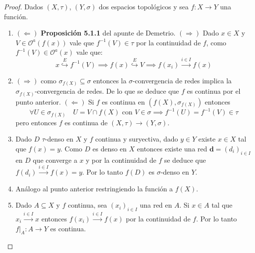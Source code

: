 \documentclass{article}
\theoremstyle{plain}
\theoremstyle{definition}
\newcommand{\evto}[1]{\stackrel{E}{\hookrightarrow} #1}   %
\begin{document}
\begin{proof}
    Dados \( (X, \tau) \), \( (Y, \sigma) \) dos espacios topológicos y sea \( f : X \to Y \) una función.
    \begin{enumerate}
        \item \( (\Leftarrow) \) \textbf{Proposición 5.1.1} del apunte de Demetrio. \( (\Rightarrow) \) Dado \( x \in X \) y \( V \in \mathcal{O}^a(f(x)) \) vale que \( f^{-1}(V) \in \tau \) por la continuidad de \( f \),
              como \( f^{-1}(V) \in \mathcal{O}^a(x) \) vale que: \[
                  x \evto{f^{-1}(V)} \implies f(x) \evto{V} \implies f(x_i) \xrightarrow{i \in I} f(x)
              \]
        \item \( (\Rightarrow) \) como \( \sigma_{f(X)} \subseteq \sigma \) entonces la \( \sigma \)-convergencia de redes implica la \( \sigma_{f(X)} \)-convergencia de redes.
              De lo que se deduce que \( f \) es continua por el punto anterior. \( (\Leftarrow) \) Si \( f \) es continua en \( (f(X), \sigma_{f(X)}) \) entonces \[
                  \forall U \in \sigma_{f(X)} \quad U = V \cap f(X) \text{ con } V \in \sigma \implies f^{-1}(U) = f^{-1}(V) \in \tau
              \]
              pero entonces \( f \) es continua de \( (X, \tau) \to (Y, \sigma) \).
        \item Dado \( D \) \( \tau \)-denso en \( X \) y \( f \) continua y suryectiva, dado \( y \in Y \) existe \( x \in X \) tal que \( f(x) = y \).
              Como \( D \) es denso en \( X \) entonces existe una red \( \mathbf{d} = {(d_i)}_{i \in I} \) en \( D \) que converge a \( x \) y por la continuidad de \( f \) se deduce que \( f(d_i) \xrightarrow{i \in I} f(x) = y \). Por lo tanto \( f(D) \) es \( \sigma \)-denso en \( Y \).
        \item Análogo al punto anterior restringiendo la función a \( f(X) \).
        \item Dado \( A \subseteq X \) y \( f \) continua, sea \( {(x_i)}_{i \in I} \) una red en \( A \). Si \( x \in A \) tal que \( x_i \xrightarrow{i \in I} x \) entonces \( f(x_i) \xrightarrow{i \in I} f(x) \) por la continuidad de \( f \). Por lo tanto \( f|_A : A \to Y \) es continua.
    \end{enumerate}
\end{proof}

\clearpage
\end{document}
